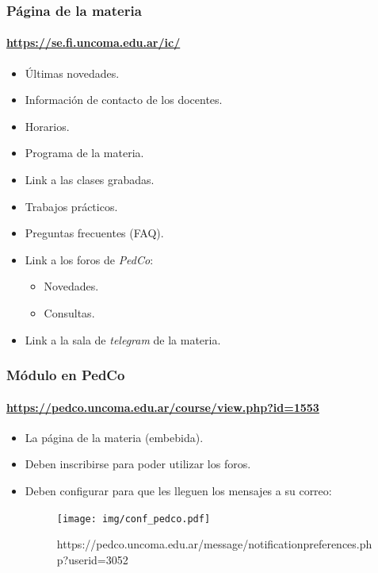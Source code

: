 \documentclass[11pt,a4paper,spanish]{beamer}
\begin{document}
\begin{frame}

    \frametitle{Página de la materia}
    \framesubtitle{\url{https://se.fi.uncoma.edu.ar/ic/}}

\begin{itemize}
    \item Últimas novedades.
    \item Información de contacto de los docentes.
    \item Horarios.
    \item Programa de la materia.
    \item Link a las clases grabadas.
    \item Trabajos prácticos.
    \item Preguntas frecuentes (FAQ).
    \item Link a los foros de \emph{PedCo}:
        \begin{itemize}
            \item Novedades.
            \item Consultas.
        \end{itemize}
    \item Link a la sala de \emph{telegram} de la materia.
\end{itemize}

\end{frame}

\begin{frame}

    \frametitle{Módulo en PedCo}
    \framesubtitle{\url{https://pedco.uncoma.edu.ar/course/view.php?id=1553}}

\begin{itemize}
    \item La página de la materia (embebida).
    \item Deben inscribirse para poder utilizar los foros.
    \item Deben configurar para que les lleguen los mensajes a su correo:
    \begin{figure}
        \texttt{[image: img/conf\_pedco.pdf]}
        \captionsetup{textfont=tiny,labelformat=empty}
        \caption{\url{}https://pedco.uncoma.edu.ar/message/notificationpreferences.php?userid=3052}
    \end{figure}
\end{itemize}

\end{frame}
\end{document}
